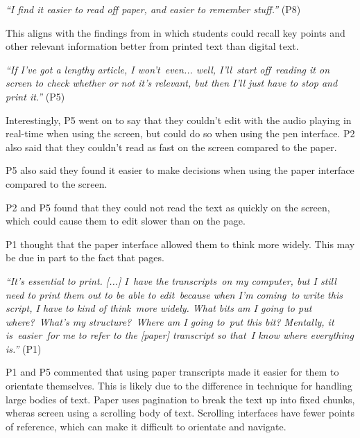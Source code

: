 \textit{``I find it easier to read off paper, and easier to remember stuff.''} (P8)

This aligns with the findings from \citet{Singer2017} in which students could recall key points and other relevant
information better from printed text than digital text.


\textit{``If I've got a lengthy article, I won't even... well, I'll start off reading it on screen to check whether or
not it's relevant, but then I'll just have to stop and print it.''} (P5)


Interestingly, P5 went on to say that they couldn't edit with the audio playing in real-time when using the screen, but
could do so when using the pen interface. P2 also said that they couldn't read as fast on the screen compared to the
paper.

P5 also said they found it easier to make decisions when using the paper interface compared to the screen.

P2 and P5 found that they could not read the text as quickly on the screen, which could cause them to edit slower than
on the page.

P1 thought that the paper interface allowed them to think more widely. This may be due in part to the fact that pages.

\textit{``It's essential to print. [...]
I have the transcripts on my computer, but I still need to print them out to be able to edit because when I'm
coming to write this script, I have to kind of think more widely. What bits am I going to put where? What's my
structure? Where am I going to put this bit? Mentally, it is easier for me to refer to the [paper] transcript so
that I know where everything is.''} (P1)


P1 and P5 commented that using paper transcripts made it easier for them to orientate themselves. This is likely due to
the difference in technique for handling large bodies of text. Paper uses pagination to break the text up into fixed
chunks, wheras screen using a scrolling body of text. Scrolling interfaces have fewer points of reference, which can
make it difficult to orientate and navigate.

